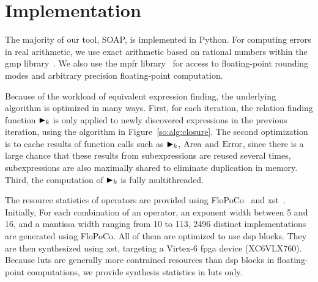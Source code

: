\section{Implementation}
\label{so:sec:implementation}

The majority of our tool, SOAP, is implemented in Python. For computing
errors in real arithmetic, we use exact arithmetic based on rational
numbers within the \gls{gmp} library~\cite{gmp}. We also use the \gls{mpfr}
library~\cite{mpfr} for access to floating-point rounding modes and arbitrary
precision floating-point computation.

Because of the workload of equivalent expression finding, the underlying
algorithm is optimized in many ways. First, for each iteration, the relation
finding function $\operatorname{\blacktriangleright}_k$ is only applied to newly discovered expressions in
the previous iteration, using the algorithm in Figure~\ref{so:alg:closure}. The
second optimization is to cache results of function calls such as $\operatorname{\blacktriangleright}_k$,
$\operatorname{\mathrm{Area}}$ and $\operatorname{\mathrm{Error}}$, since there is a large chance that these results
from subexpressions are reused several times, subexpressions are also
maximally shared to eliminate duplication in memory. Third, the computation of
$\operatorname{\blacktriangleright}_k$ is fully multithreaded.

The resource statistics of operators are provided using FloPoCo~\cite{flopoco}
and \gls{xst}~\cite{xst}. Initially, For each combination of an operator, an
exponent width between 5 and 16, and a mantissa width ranging from 10 to 113,
2496 distinct implementations are generated using FloPoCo. All of them are
optimized to use \gls{dsp} blocks. They are then synthesized using \gls{xst},
targeting a Virtex-6 \gls{fpga} device (XC6VLX760). Because \glspl{lut} are
generally more contrained resources than \gls{dsp} blocks in floating-point
computations, we provide synthesis statistics in \glspl{lut} only.
